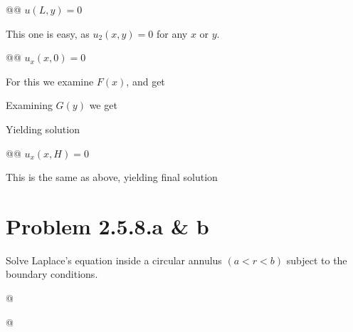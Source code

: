 \documentclass[10pt]{article}
\begin{document}
\begin{easylist}[enumerate]
    @@ $u(L, y) = 0$

    This one is easy, as $u_2(x, y) = 0$ for any $x$ or $y$.

    @@ $u_x(x, 0) = 0$

    For this we examine $F(x)$, and get


    Examining $G(y)$ we get


    Yielding solution


    @@ $u_x(x, H) = 0$

    This is the same as above, yielding final solution

\end{easylist}

\newpage
\section{Problem 2.5.8.a \& b}

Solve Laplace's equation inside a circular annulus $(a < r< b)$ subject to the boundary conditions.

\begin{easylist}[enumerate]
    @ 

    @ 
\end{easylist}
\end{document}

